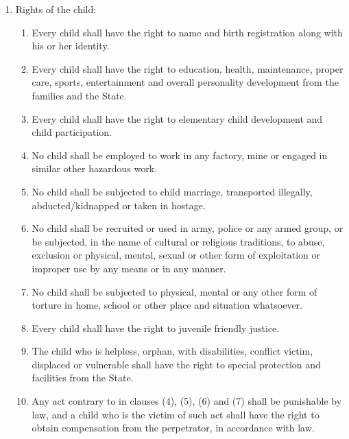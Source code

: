 \begin{questions}
\begin{solution}
\begin{enumerate}
\item Rights of the child:
\begin{enumerate}
    \item Every child shall have the right to name and birth registration along with his or her identity.
    \item Every child shall have the right to education, health, maintenance, proper care, sports, entertainment and overall personality development from the families and the State.
    \item Every child shall have the right to elementary child development and child participation.
    \item No child shall be employed to work in any factory, mine or engaged in similar other hazardous work.
    \item No child shall be subjected to child marriage, transported illegally, abducted/kidnapped or taken in hostage.
    \item No child shall be recruited or used in army, police or any armed group, or be subjected, in the name of cultural or religious traditions, to abuse, exclusion or physical, mental, sexual or other form of exploitation or improper use by any means or in any manner.
    \item No child shall be subjected to physical, mental or any other form of torture in home, school or other place and situation whatsoever.
    \item Every child shall have the right to juvenile friendly justice.
    \item The child who is helpless, orphan, with disabilities, conflict victim, displaced or vulnerable shall have the right to special protection and facilities from the State.
    \item Any act contrary to in clauses (4), (5), (6) and (7) shall be punishable by law, and a child who is the victim of such act shall have the right to obtain compensation from the perpetrator, in accordance with law.
\end{enumerate}


\end{enumerate}
\end{solution}
\end{questions}
